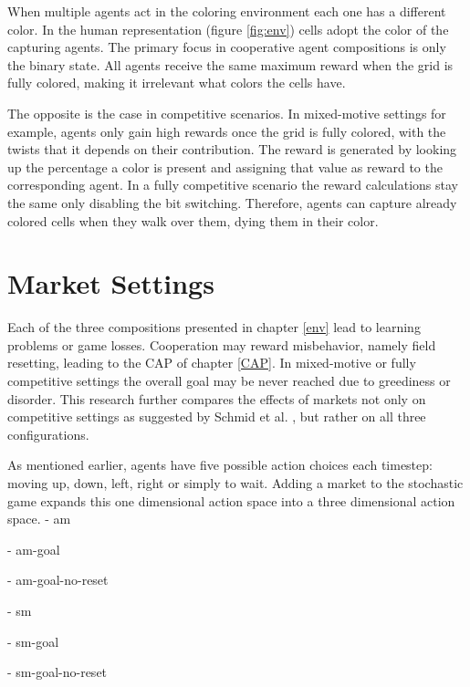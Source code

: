 When multiple agents act in the coloring environment each one has a different color. In the human representation (figure \ref{fig:env}) cells adopt the color of the capturing agents. The primary focus in cooperative agent compositions is only the binary state. All agents receive the same maximum reward when the grid is fully colored, making it irrelevant what colors the cells have.

The opposite is the case in competitive scenarios. In mixed-motive settings for example, agents only gain high rewards once the grid is fully colored, with the twists that it depends on their contribution. The reward is generated by looking up the percentage a color is present and assigning that value as reward to the corresponding agent. In a fully competitive scenario the reward calculations stay the same only disabling the bit switching. Therefore, agents can capture already colored cells when they walk over them, dying them in their color.

\section{Market Settings}
Each of the three compositions presented in chapter \ref{env} lead to learning problems or game losses. Cooperation may reward misbehavior, namely field resetting, leading to the CAP of chapter \ref{CAP}. In mixed-motive or fully competitive settings the overall goal may be never reached due to greediness or disorder. This research further compares the effects of markets not only on competitive settings as suggested by Schmid et al. \cite{scbe21}, but rather on all three configurations.

As mentioned earlier, agents have five possible action choices each timestep: moving up, down, left, right or simply to wait. Adding a market to the stochastic game expands this one dimensional action space into a three dimensional action space. 
- am

- am-goal

- am-goal-no-reset

- sm

- sm-goal

- sm-goal-no-reset
